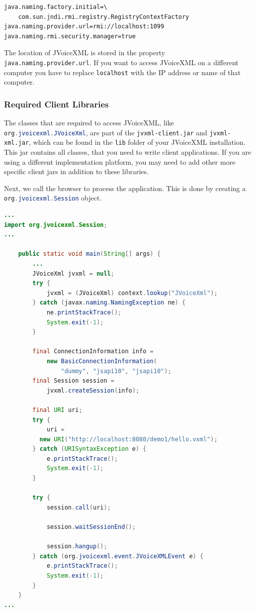 \documentclass[11pt,a4paper]{article}
\begin{document}
\begin{lstlisting}
java.naming.factory.initial=\
    com.sun.jndi.rmi.registry.RegistryContextFactory
java.naming.provider.url=rmi://localhost:1099
java.naming.rmi.security.manager=true
\end{lstlisting}

The location of JVoiceXML is stored in the property 
\texttt{java.naming.pro\-vider.url}. If you want to access JVoiceXML on a 
different computer you have to replace \texttt{localhost} with the IP address 
or name of that computer.

\subsubsection{Required Client Libraries}

The classes  that are required to access JVoiceXML, like
\lstinline[language=Java]{org.jvoicexml.JVoiceXml}, are part of the \texttt{jvxml-client.jar} and
\texttt{jvxml-xml.jar}, which can be found in the \texttt{lib} folder of your
JVoiceXML installation. This jar contains all classes, that you need to write
client applications. If you are using a different implementation platform, you
may need to add other more specific client jars in addition to these libraries.

Next, we call the browser to process the application. This is done
by creating a \lstinline[language=Java]{org.jvoicexml.Session} object.

\begin{lstlisting}[language=Java]
...
import org.jvoicexml.Session;
...

    public static void main(String[] args) {
        ...
        JVoiceXml jvxml = null;
        try {
            jvxml = (JVoiceXml) context.lookup("JVoiceXml");
        } catch (javax.naming.NamingException ne) {
            ne.printStackTrace();
            System.exit(-1);
        }

        final ConnectionInformation info =
            new BasicConnectionInformation(
                "dummy", "jsapi10", "jsapi10");
        final Session session = 
            jvxml.createSession(info);

        final URI uri;
        try {
            uri = 
          new URI("http://localhost:8080/demo1/hello.vxml");
        } catch (URISyntaxException e) {
            e.printStackTrace();
            System.exit(-1);
        }

        try {
            session.call(uri);

            session.waitSessionEnd();

            session.hangup();
        } catch (org.jvoicexml.event.JVoiceXMLEvent e) {
            e.printStackTrace();
            System.exit(-1);
        }
    }
...
\end{lstlisting}
\end{document}
